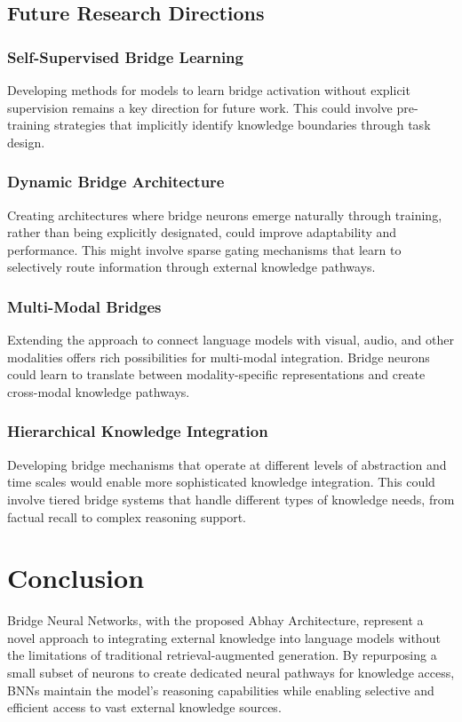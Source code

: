 \documentclass[9pt,a4paper,twocolumn,twoside]{tau-class/tau}
\begin{document}
\subsection{Future Research Directions}

\subsubsection{Self-Supervised Bridge Learning}
    Developing methods for models to learn bridge activation without explicit supervision remains a key direction for future work. This could involve pre-training strategies that implicitly identify knowledge boundaries through task design.

\subsubsection{Dynamic Bridge Architecture}
    Creating architectures where bridge neurons emerge naturally through training, rather than being explicitly designated, could improve adaptability and performance. This might involve sparse gating mechanisms that learn to selectively route information through external knowledge pathways.

\subsubsection{Multi-Modal Bridges}
    Extending the approach to connect language models with visual, audio, and other modalities offers rich possibilities for multi-modal integration. Bridge neurons could learn to translate between modality-specific representations and create cross-modal knowledge pathways.

\subsubsection{Hierarchical Knowledge Integration}
    Developing bridge mechanisms that operate at different levels of abstraction and time scales would enable more sophisticated knowledge integration. This could involve tiered bridge systems that handle different types of knowledge needs, from factual recall to complex reasoning support.

\section{Conclusion}

    Bridge Neural Networks, with the proposed Abhay Architecture, represent a novel approach to integrating external knowledge into language models without the limitations of traditional retrieval-augmented generation. By repurposing a small subset of neurons to create dedicated neural pathways for knowledge access, BNNs maintain the model's reasoning capabilities while enabling selective and efficient access to vast external knowledge sources.
\end{document}
